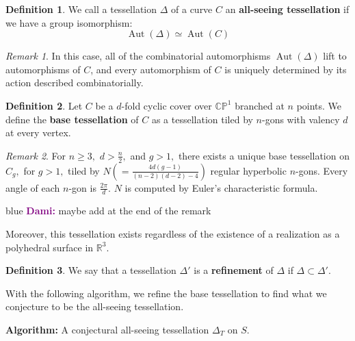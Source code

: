 \documentclass[12pt,reqno]{amsart}
\newenvironment{dami}{
  \medskip
\begin{color}{blue}
    \textcolor{purple}{\textbf{Dami:}} 
}{
\end{color}
  \medskip
}
\DeclareMathOperator{\Aut}{Aut}
\newcommand{\R}{\mathbb{R}}
\theoremstyle{definition}
\newtheorem{defn}{Definition}
\theoremstyle{remark}
\newtheorem*{remark}{Remark}
\newcommand{\DD}{\Delta\kern -8.3pt {\diamond} \kern -4.5pt \cdot \:}
\begin{document}
\begin{defn} We call a tessellation $\Delta$ of a curve $C$ an \textbf{all-seeing tessellation} if we have a group isomorphism: $$\Aut(\Delta) \simeq \Aut(C)$$ 
\end{defn}

\begin{remark} In this case, all of the combinatorial automorphisms $\Aut(\Delta)$ lift to automorphisms of $C$, and every automorphism of $C$ is uniquely determined by its action described combinatorially.\end{remark}


\begin{defn} \label{defn: base tess} Let $C$ be a $d$-fold cyclic cover over $\mathbb{C}\mathbb{P}^1$ branched at $n$ points. We define the \textbf{base tessellation} of $C$ as a tessellation tiled by $n$-gons with valency $d$ at every vertex. \end{defn}

\begin{remark} For $n \geq 3,$ $d > \frac{n}{2},$ and $g > 1,$ there exists a unique base tessellation on $C_g,$ for $g > 1,$ tiled by $N (= \frac{4 d (g - 1)}{(n - 2) (d - 2) - 4})$ regular hyperbolic $n$-gons. Every angle of each $n$-gon is $\frac{2 \pi}{d}.$ $N$ is computed by Euler's characteristic formula. \end{remark}

\begin{dami} maybe add at the end of the remark 

Moreover, this tessellation exists regardless of the existence of a realization as a polyhedral surface in $\R^3.$

\end{dami}

\begin{defn} We say that a tessellation $\Delta'$ is a \textbf{refinement} of $\Delta$ if $\Delta \subset \Delta'$. \end{defn}

With the following algorithm, we refine the base tessellation to find what we conjecture to be the all-seeing tessellation. 

\vspace{+7pt}


\textbf{Algorithm:} A conjectural all-seeing tessellation $\Delta_T$ on $S$.
\end{document}
